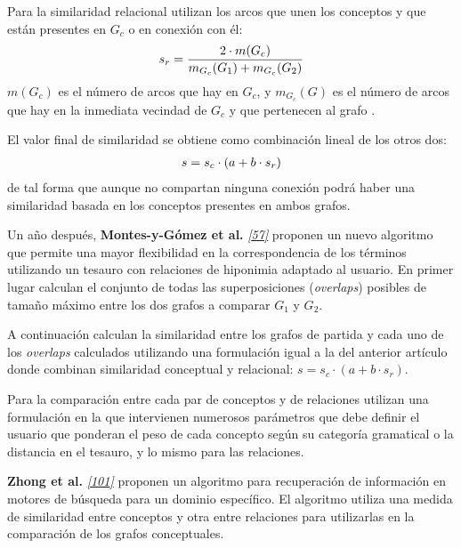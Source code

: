 \documentclass[a4paper,12pt,spanish]{book}
\begin{document}
Para la similaridad relacional utilizan los arcos que unen los conceptos y que están presentes
en \(G_c\) o en conexión con él:
\begin{gather}
\begin{split}s_r = \frac{2 \cdot m(G_c)}{m_{G_c}(G_1) + m_{G_c}(G_2)}\end{split}\notag
\end{gather}
\(m(G_c)\) es el número de arcos que hay en \(G_c\), y \(m_{G_c}(G)\) es el número
de arcos que hay en la inmediata vecindad de \(G_c\) y que pertenecen al grafo .

El valor final de similaridad se obtiene como combinación lineal de los otros dos:
\begin{gather}
\begin{split}s = s_c \cdot (a + b \cdot s_r)\end{split}\notag
\end{gather}
de tal forma que aunque no compartan ninguna conexión podrá haber una similaridad basada en
los conceptos presentes en ambos grafos.

Un año después, \textbf{Montes-y-Gómez et al.} \label{1.state-of-the-art/iii.distancia-semantica:id15}{\hyperref[zreferences:montes2001]{\emph{{[}57{]}}}} proponen un nuevo algoritmo
que permite una mayor flexibilidad en la correspondencia de los términos utilizando un
tesauro con relaciones de hiponimia adaptado al usuario. En primer lugar calculan el conjunto
de todas las superposiciones (\emph{overlaps}) posibles de tamaño máximo entre los dos grafos
a comparar \(G_1\) y \(G_2\).

A continuación calculan la similaridad entre los grafos de partida y cada uno de los
\emph{overlaps} calculados utilizando una formulación igual a la del anterior artículo donde
combinan similaridad conceptual y relacional: \(s = s_c \cdot (a + b \cdot s_r)\).

Para la comparación entre cada par de conceptos y de relaciones utilizan una formulación
en la que intervienen numerosos parámetros que debe definir el usuario que ponderan el
peso de cada concepto según su categoría gramatical o la distancia en el tesauro, y lo mismo
para las relaciones.

\textbf{Zhong et al.} \label{1.state-of-the-art/iii.distancia-semantica:id16}{\hyperref[zreferences:zhong2002]{\emph{{[}101{]}}}} proponen un algoritmo para recuperación de información
en motores de búsqueda para un dominio específico. El algoritmo utiliza una medida de
similaridad entre conceptos y otra entre relaciones para utilizarlas en la comparación de
los grafos conceptuales.
\end{document}
